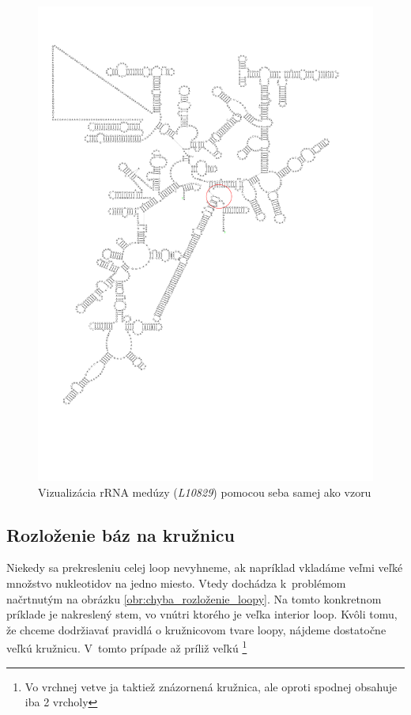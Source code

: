 \begin{figure}
  \includegraphics[clip, trim=0 4cm 2cm 2cm, width=1\textwidth]{../img/chyby/tripedalia_cystophora-tripedalia_cystophora}
  \caption{Vizualizácia rRNA medúzy (\textit{L10829}) pomocou seba samej ako vzoru}
  \label{obr:chyba_otocenie_vetvy}
\end{figure}

\subsection{Rozloženie báz na kružnicu}

Niekedy sa prekresleniu celej loop nevyhneme, ak napríklad vkladáme veľmi veľké množstvo nukleotidov na jedno
miesto. Vtedy dochádza k~problémom načrtnutým na obrázku \ref{obr:chyba_rozloženie_loopy}.
Na tomto konkretnom príklade je nakreslený stem, vo vnútri ktorého je veľka interior loop. Kvôli tomu,
že chceme dodržiavať pravidlá o kružnicovom tvare loopy, nájdeme dostatočne veľkú kružnicu.
V~tomto prípade až príliž veľkú%
\footnote{Vo vrchnej vetve ja taktiež znázornená kružnica, ale oproti spodnej obsahuje iba 2 vrcholy}

